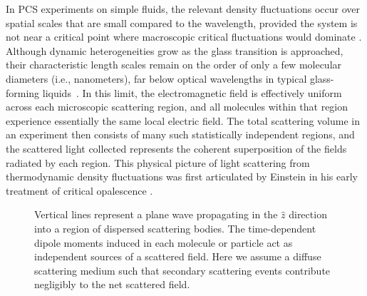 In PCS experiments on simple fluids, the relevant density fluctuations occur over spatial scales that are small compared to the wavelength, provided the system is not near a critical point where macroscopic critical fluctuations would dominate \cite{Stanley1971}. Although dynamic heterogeneities grow as the glass transition is approached, their characteristic length scales remain on the order of only a few molecular diameters (i.e., nanometers), far below optical wavelengths in typical glass-forming liquids~\cite{BerthierBiroli2011,Ediger2000}. In this limit, the electromagnetic field is effectively uniform across each microscopic scattering region, and all molecules within that region experience essentially the same local electric field. The total scattering volume in an experiment then consists of many such statistically independent regions, and the scattered light collected represents the coherent superposition of the fields radiated by each region. This physical picture of light scattering from thermodynamic density fluctuations was first articulated by Einstein in his early treatment of critical opalescence \cite{Einstein1910}.


\begin{figure}[!htbp]
	\centering
	\caption{Vertical lines represent a plane wave propagating in the $\hat{z}$ direction into a region of dispersed scattering bodies. The time-dependent dipole moments induced in each molecule or particle act as independent sources of a scattered field. Here we assume a diffuse scattering medium such that secondary scattering events contribute negligibly to the net scattered field\nolinebreak \cite{Berne}.}\label{figure:planescatter}
\end{figure}

